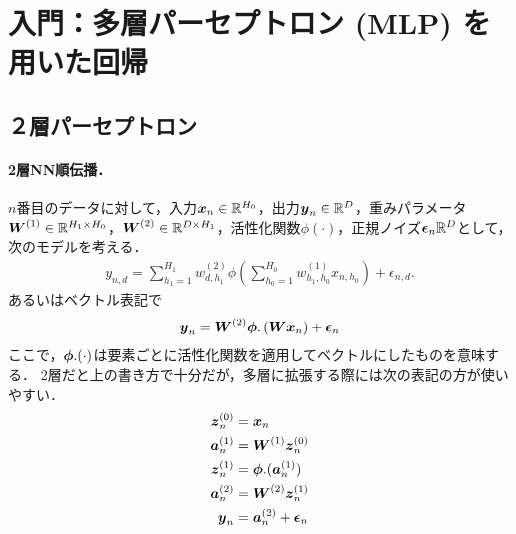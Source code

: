 \section{入門：多層パーセプトロン (MLP) を用いた回帰}
\subsection{２層パーセプトロン}
\label{subsec:2layerNN}
\paragraph{2層NN順伝播．}
$n$番目のデータに対して，入力$\vx_n\in\mathbb{R}^{H_0}$，出力$\vy_n\in\mathbb{R}^{D}$，重みパラメータ$\vW^{(1)}\in\mathbb{R}^{H_1\times H_0}$，$\vW^{(2)}\in\mathbb{R}^{D\times H_1}$，活性化関数$\phi(\cdot)$，正規ノイズ$\vepsilon_n\mathbb{R}^{D}$として，次のモデルを考える．
\begin{align*}
 y_{n,d} = \sum_{h_1=1}^{H_1}w^{(2)}_{d,h_1}\phi\left( \sum_{h_0=1}^{H_0}w^{(1)}_{h_1,h_0}x_{n,h_0} \right) + \epsilon_{n,d}.
\end{align*}
あるいはベクトル表記で
\begin{align*}
 \vy_n
 =
 \vW^{(2)} \vphi.\left( \vW\vx_n \right) + \vepsilon_n
\end{align*}
ここで，$ \vphi.(\cdot)$は要素ごとに活性化関数を適用してベクトルにしたものを意味する．
2層だと上の書き方で十分だが，多層に拡張する際には次の表記の方が使いやすい．
\begin{align*}
 \vz^{(0)}_n &= \vx_n
 \\
 \va^{(1)}_n &= \vW^{(1)}\vz^{(0)}_n
 \\
 \vz^{(1)}_n &= \vphi.(\va^{(1)}_n)
 \\
 \va^{(2)}_n &= \vW^{(2)}\vz^{(1)}_n
 \\
 \vy_n &= \va^{(2)}_n + \vepsilon_n
\end{align*}


